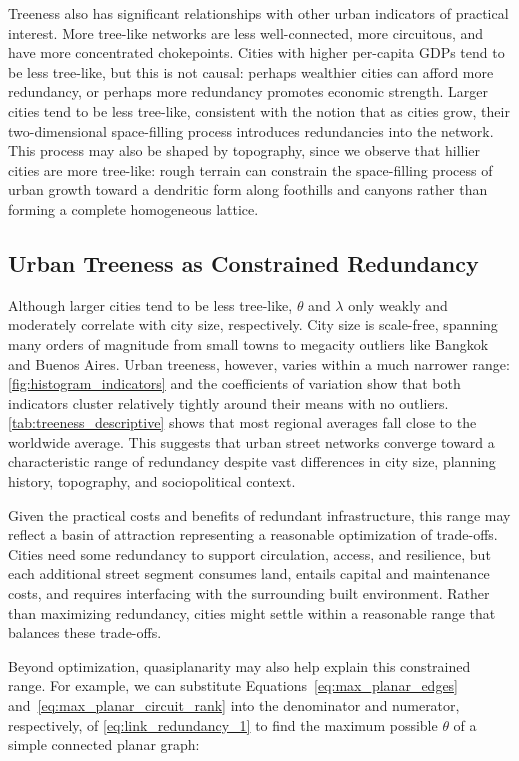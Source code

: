\documentclass[12pt,letterpaper]{article} %
\begin{document}
Treeness also has significant relationships with other urban indicators of practical interest. More tree-like networks are less well-connected, more circuitous, and have more concentrated chokepoints. Cities with higher per-capita GDPs tend to be less tree-like, but this is not causal: perhaps wealthier cities can afford more redundancy, or perhaps more redundancy promotes economic strength. Larger cities tend to be less tree-like, consistent with the notion that as cities grow, their two-dimensional space-filling process introduces redundancies into the network. This process may also be shaped by topography, since we observe that hillier cities are more tree-like: rough terrain can constrain the space-filling process of urban growth toward a dendritic form along foothills and canyons rather than forming a complete homogeneous lattice.

\subsection{Urban Treeness as Constrained Redundancy}

Although larger cities tend to be less tree-like, $\theta$ and $\lambda$ only weakly and moderately correlate with city size, respectively. City size is scale-free, spanning many orders of magnitude from small towns to megacity outliers like Bangkok and Buenos Aires. Urban treeness, however, varies within a much narrower range: \autoref{fig:histogram_indicators} and the coefficients of variation show that both indicators cluster relatively tightly around their means with no outliers. \autoref{tab:treeness_descriptive} shows that most regional averages fall close to the worldwide average. This suggests that urban street networks converge toward a characteristic range of redundancy despite vast differences in city size, planning history, topography, and sociopolitical context.

Given the practical costs and benefits of redundant infrastructure, this range may reflect a basin of attraction representing a reasonable optimization of trade-offs. Cities need some redundancy to support circulation, access, and resilience, but each additional street segment consumes land, entails capital and maintenance costs, and requires interfacing with the surrounding built environment. Rather than maximizing redundancy, cities might settle within a reasonable range that balances these trade-offs.

Beyond optimization, quasiplanarity may also help explain this constrained range. For example, we can substitute Equations~\ref{eq:max_planar_edges} and~\ref{eq:max_planar_circuit_rank} into the denominator and numerator, respectively, of \autoref{eq:link_redundancy_1} to find the maximum possible $\theta$ of a simple connected planar graph:
\end{document}
